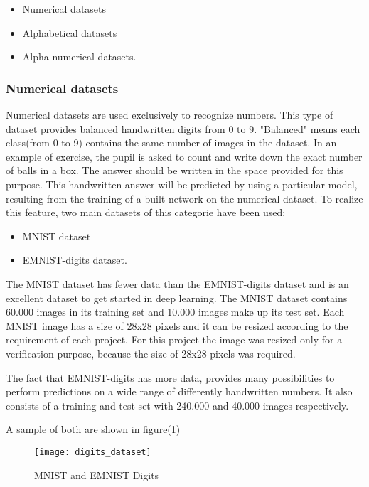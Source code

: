 \begin{itemize}
    \item Numerical datasets
    \item Alphabetical datasets
    \item Alpha-numerical datasets.
  \end{itemize}

\subsubsection{Numerical datasets}
Numerical datasets are used exclusively to recognize numbers. 
This type of dataset provides balanced handwritten digits from 0 to 9. 
"Balanced" means each class(from 0 to 9) contains the same number of images in the dataset. 
In an example of exercise, the pupil is asked to count and write down the exact number of balls in a box. 
The answer should be written in the space provided for this purpose.
This handwritten answer will be predicted by using a particular model, resulting from the training of a built network on the numerical dataset. 
To realize this feature, two main datasets of this categorie have been used:
\begin{itemize}
    \item MNIST dataset
    \item EMNIST-digits dataset.
  \end{itemize}

\noindent
The MNIST dataset has fewer data than the EMNIST-digits dataset and is an excellent dataset to get started in 
deep learning. 
The MNIST dataset contains 60.000 images in its training set and 10.000 images make up its test set. 
Each MNIST image has a size of 28x28 pixels and it can be resized according to the requirement of each project.
For this project the image was resized only for a verification purpose, because the size of 28x28 pixels was required. \hfill \break

\noindent
The fact that EMNIST-digits has more data, provides many possibilities 
to perform predictions on a wide range of differently handwritten numbers.
It also consists of a training and test set with 240.000 and 40.000 images respectively. \hfill \break

\noindent
A sample of both are shown in figure(\ref{Abb:digits_sample}) 
\begin{figure}[htb]
	\centering
	\texttt{[image: digits\_dataset]}
	\caption[Digits datasets]{MNIST and EMNIST Digits}\label{Abb:digits_sample}
\end{figure}


